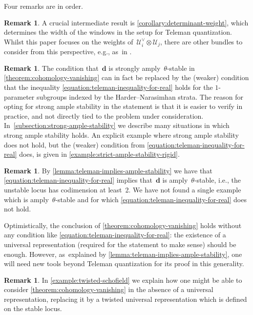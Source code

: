 \documentclass[JEP,XML,SOM,Unicode,NoEqCountersInSection,published]{cedram}
\theoremstyle{plain}
\theoremstyle{definition}
\newtheorem{remark}[theorem]{Remark}
\newcommand\dash{\nobreakdash-\hspace{0pt}}
\newcommand\tuple[1]{\ensuremath{{\boldsymbol{#1}}}}
\begin{document}
Four remarks are in order.

\begin{remark}
A crucial intermediate result is \cref{corollary:determinant-weight},
which determines the width of the windows in the setup for Teleman quantization.
Whilst this paper focuses on the weights of~$\mathcal{U}^\vee_i \otimes \mathcal{U}_j$,
there are other bundles to consider from this perspective,
e.g., as~in \cite{MR4894756}.
\end{remark}

\begin{remark}
\label{remark:strong-ample-stability}
The condition that~$\tuple{d}$ is strongly amply~$\theta$\dash stable
in \cref{theorem:cohomology-vanishing} can in fact be replaced by
the (weaker) condition
that the inequality \eqref{equation:teleman-inequality-for-real}
holds for the $1$-parameter subgroups indexed by the Harder--Narasimhan strata.
The reason for opting for strong ample stability in the statement
is that it is easier to verify in practice,
and not directly tied to the problem under consideration. In~\cref{subsection:strong-ample-stability} we describe many situations
in which strong ample stability holds.
An explicit example where strong ample stability does not hold,
but the (weaker) condition from \eqref{equation:teleman-inequality-for-real} does,
is given in \cref{example:strict-ample-stability-rigid}.
\end{remark}

\begin{remark}
\label{remark:ample-stability}
By \cref{lemma:teleman-implies-ample-stability}
we have that \eqref{equation:teleman-inequality-for-real}
implies that~$\tuple{d}$ is amply~$\theta$\dash stable,
i.e., the unstable locus has codimension at least~2.
We have not found a single example which is amply~$\theta$-stable
and for which \eqref{equation:teleman-inequality-for-real} does not hold.

Optimistically, the conclusion of \cref{theorem:cohomology-vanishing} holds
without any condition like \eqref{equation:teleman-inequality-for-real}:
the existence of a universal representation (required for the statement to make sense)
should be enough.
However, as~explained by \cref{lemma:teleman-implies-ample-stability},
one will need new tools beyond Teleman quantization for its proof in this generality.
\end{remark}

\begin{remark}
In \cref{example:twisted-schofield}
we explain how one might be able to consider \cref{theorem:cohomology-vanishing}
in the absence of a universal representation,
replacing it by a twisted universal representation
which is defined on the stable locus.
\end{remark}
\end{document}
